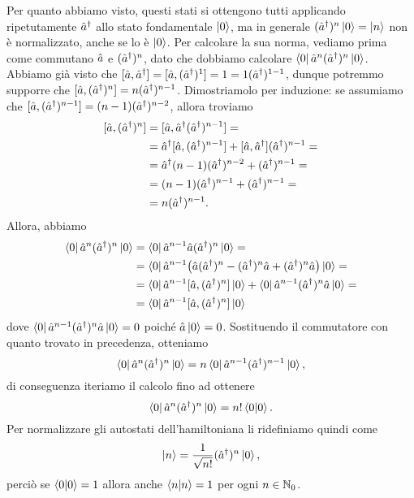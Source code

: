 Per quanto abbiamo visto, questi stati si ottengono tutti applicando ripetutamente ${\hat{a}}^\dagger$ allo stato fondamentale $\left|{0}\right\rangle$, ma in generale $({\hat{a}}^\dagger)^n\left|{0}\right\rangle=\left|{n}\right\rangle$ non è normalizzato, anche se lo è $\left|{0}\right\rangle$.
Per calcolare la sua norma, vediamo prima come commutano $\hat{a}$ e $({\hat{a}}^\dagger)^n$, dato che dobbiamo calcolare $\left\langle{0}\right|\hat{a}^n({\hat{a}}^\dagger)^n\left|{0}\right\rangle$.
Abbiamo già visto che $[\hat{a},{\hat{a}}^\dagger]=[\hat{a},({\hat{a}}^\dagger)^1]=1=1({\hat{a}}^\dagger)^{1-1}$, dunque potremmo supporre che $[\hat{a},({\hat{a}}^\dagger)^n]=n({\hat{a}}^\dagger)^{n-1}$.
Dimostriamolo per induzione: se assumiamo che $[\hat{a},({\hat{a}}^\dagger)^{n-1}]=(n-1)({\hat{a}}^\dagger)^{n-2}$, allora troviamo
\begin{equation}
	\begin{split}
		[\hat{a},({\hat{a}}^\dagger)^n]&=[\hat{a},{\hat{a}}^\dagger({\hat{a}}^\dagger)^{n-1}]=\\
		&={\hat{a}}^\dagger[\hat{a},({\hat{a}}^\dagger)^{n-1}]+[\hat{a},{\hat{a}}^\dagger]({\hat{a}}^\dagger)^{n-1}=\\
		&={\hat{a}}^\dagger(n-1)({\hat{a}}^\dagger)^{n-2}+({\hat{a}}^\dagger)^{n-1}=\\
		&=(n-1)({\hat{a}}^\dagger)^{n-1}+({\hat{a}}^\dagger)^{n-1}=\\
		&=n({\hat{a}}^\dagger)^{n-1}.
	\end{split}
\end{equation}
Allora, abbiamo
\begin{equation}
	\begin{split}
		\left\langle{0}\right|\hat{a}^n({\hat{a}}^\dagger)^n\left|{0}\right\rangle&=\left\langle{0}\right|\hat{a}^{n-1}\hat{a}({\hat{a}}^\dagger)^n\left|{0}\right\rangle=\\
		&=\left\langle{0}\right|\hat{a}^{n-1}\big(\hat{a}({\hat{a}}^\dagger)^n-({\hat{a}}^\dagger)^n\hat{a}+({\hat{a}}^\dagger)^n\hat{a}\big)\left|{0}\right\rangle=\\
		&=\left\langle{0}\right|\hat{a}^{n-1}[\hat{a},({\hat{a}}^\dagger)^n]\left|{0}\right\rangle+\left\langle{0}\right|\hat{a}^{n-1}({\hat{a}}^\dagger)^n\hat{a}\left|{0}\right\rangle=\\
		&=\left\langle{0}\right|\hat{a}^{n-1}[\hat{a},({\hat{a}}^\dagger)^n]\left|{0}\right\rangle
	\end{split}
\end{equation}
dove $\left\langle{0}\right|\hat{a}^{n-1}({\hat{a}}^\dagger)^n\hat{a}\left|{0}\right\rangle=0$ poich\'e $\hat{a}\left|{0}\right\rangle=0$.
Sostituendo il commutatore con quanto trovato in precedenza, otteniamo
\begin{equation}
	\left\langle{0}\right|\hat{a}^n({\hat{a}}^\dagger)^n\left|{0}\right\rangle=n\left\langle{0}\right|\hat{a}^{n-1}({\hat{a}}^\dagger)^{n-1}\left|{0}\right\rangle,
\end{equation}
di conseguenza iteriamo il calcolo fino ad ottenere
\begin{equation}
	\left\langle{0}\right|\hat{a}^n({\hat{a}}^\dagger)^n\left|{0}\right\rangle=n!\left\langle{0}\middle|{0}\right\rangle.
\end{equation}
Per normalizzare gli autostati dell'hamiltoniana li ridefiniamo quindi come
\begin{equation}
	\left|{n}\right\rangle=\frac1{\sqrt{n!}}({\hat{a}}^\dagger)^n\left|{0}\right\rangle,
	\label{eq:oscillatore-armonico-autostati-ortonormali}
\end{equation}
perciò se $\left\langle{0}\middle|{0}\right\rangle=1$ allora anche $\left\langle{n}\middle|{n}\right\rangle=1$ per ogni $n\in\mathbb{N}_0$.

